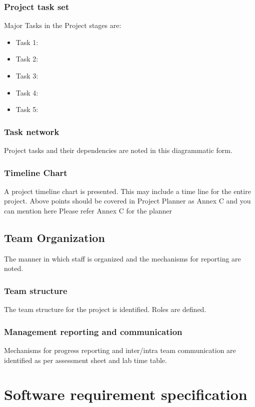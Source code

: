 \documentclass[12pt,a4paper]{article}
\begin{document}
\subsubsection{Project task set}  
Major Tasks in the Project stages are:
\begin{itemize}
  \item Task 1:
  \item Task 2: 
  \item Task 3: 
  \item Task 4: 
  \item Task 5: 
\end{itemize}

\subsubsection{Task network}  
Project tasks and their dependencies are noted in this diagrammatic form.
\subsubsection{Timeline Chart}  
A project timeline chart is presented. This may include a time line for the entire project.
Above points should be covered  in Project Planner as Annex C and you can mention here Please refer Annex C for the planner

 
\subsection{Team Organization}
The manner in which staff is organized and the mechanisms for reporting are noted.  
\subsubsection{Team structure}
The team structure for the project is identified. Roles are defined.

\subsubsection{Management reporting and communication}
Mechanisms for progress reporting and inter/intra team communication are identified as per assessment sheet and lab time table. 
 

\section{Software requirement specification  }
\setcounter{section}{7}
\end{document}
